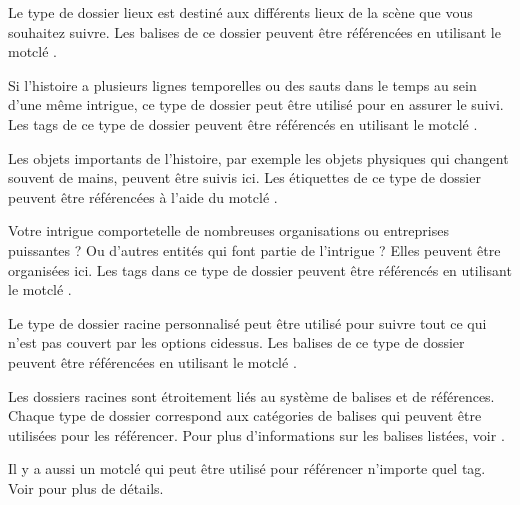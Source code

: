 \documentclass[a4paper,11pt,french]{sphinxmanual}
\begin{document}
\begin{description}
\sphinxAtStartPar
Le type de dossier lieux est destiné aux différents lieux de la scène que vous souhaitez suivre. Les balises de ce dossier peuvent être référencées en utilisant le mot\sphinxhyphen{}clé .

\sphinxAtStartPar
Si l’histoire a plusieurs lignes temporelles ou des sauts dans le temps au sein d’une même intrigue, ce type de dossier peut être utilisé pour en assurer le suivi. Les tags de ce type de dossier peuvent être référencés en utilisant le mot\sphinxhyphen{}clé .

\sphinxAtStartPar
Les objets importants de l’histoire, par exemple les objets physiques qui changent souvent de mains, peuvent être suivis ici. Les étiquettes de ce type de dossier peuvent être référencées à l’aide du mot\sphinxhyphen{}clé .

\sphinxAtStartPar
Votre intrigue comporte\sphinxhyphen{}t\sphinxhyphen{}elle de nombreuses organisations ou entreprises puissantes ? Ou d’autres entités qui font partie de l’intrigue ? Elles peuvent être organisées ici. Les tags dans ce type de dossier peuvent être référencés en utilisant le mot\sphinxhyphen{}clé .

\sphinxAtStartPar
Le type de dossier racine personnalisé peut être utilisé pour suivre tout ce qui n’est pas couvert par les options ci\sphinxhyphen{}dessus. Les balises de ce type de dossier peuvent être référencées en utilisant le mot\sphinxhyphen{}clé .

\end{description}

\sphinxAtStartPar
Les dossiers racines sont étroitement liés au système de balises et de références. Chaque type de dossier correspond aux catégories de balises qui peuvent être utilisées pour les référencer. Pour plus d’informations sur les balises listées, voir {\hyperref[\detokenize{project_references:a-references-references}]{}}.

\sphinxAtStartPar
Il y a aussi un mot\sphinxhyphen{}clé  qui peut être utilisé pour référencer n’importe quel tag. Voir {\hyperref[\detokenize{project_references:a-references-references}]{}} pour plus de détails.
\end{document}
